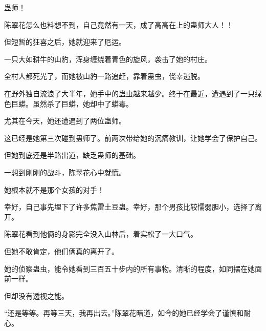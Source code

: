 \begin{this_body}
蛊师！

陈翠花怎么也料想不到，自己竟然有一天，成了高高在上的蛊师大人！！

但短暂的狂喜之后，她就迎来了厄运。

一只大如耕牛的山豹，浑身缠绕着青色的旋风，袭击了她的村庄。

全村人都死光了，而她被山豹一路追赶，靠着蛊虫，侥幸逃脱。

在野外独自流浪了大半年，她手中的蛊虫越来越少。终于在最近，遭遇到了一只绿色巨蟒。虽然杀了巨蟒，她却中了蟒毒。

尤其在今天，她还遭遇到了两位蛊师。

这已经是她第三次碰到蛊师了。前两次带给她的沉痛教训，让她学会了保护自己。

但她到底还是半路出道，缺乏蛊师的基础。

一想到刚刚的战斗，陈翠花心中就慌。

她根本就不是那个女孩的对手！

幸好，自己事先埋下了许多焦雷土豆蛊。幸好，那个男孩比较懦弱胆小，选择了离开。

陈翠花看到他俩的身影完全没入山林后，着实松了一大口气。

但她不敢肯定，他们俩真的离开了。

她的侦察蛊虫，能令她看到三百五十步内的所有事物。清晰的程度，如同摆在她面前一样。

但却没有透视之能。

“还是等等。再等三天，我再出去。”陈翠花暗道，如今的她已经学会了谨慎和耐心。

\end{this_body}

